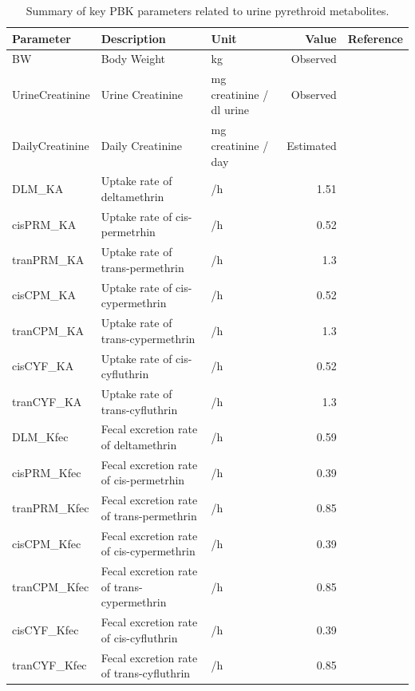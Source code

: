 \documentclass[toxics,article,submit,pdftex,moreauthors]{Definitions/mdpi}
\begin{document}
\begin{table}[H]
\begin{adjustwidth}{-4cm}{}
\caption{Summary of key PBK parameters related to urine pyrethroid metabolites.}
\label{tab:taba3}
\centering
\small
\begin{tabular}{lllrr}
\toprule
Parameter & Description & Unit & Value & Reference\\
\midrule
BW & Body Weight & kg & Observed & \\
UrineCreatinine & Urine Creatinine & mg creatinine / dl urine & Observed & \\
DailyCreatinine & Daily Creatinine & mg creatinine / day & Estimated & \cite{stanfield2022bayesian}\\
DLM\_KA & Uptake rate of deltamethrin & /h & 1.51 & \cite{quindroit2019estimating}\\
cisPRM\_KA & Uptake rate of cis-permetrhin & /h & 0.52 & \cite{quindroit2019estimating}\\
tranPRM\_KA & Uptake rate of trans-permethrin & /h & 1.3 & \cite{quindroit2019estimating}\\
cisCPM\_KA & Uptake rate of cis-cypermethrin & /h & 0.52 & \cite{quindroit2019estimating}\\
tranCPM\_KA & Uptake rate of trans-cypermethrin & /h & 1.3 & \cite{quindroit2019estimating}\\
cisCYF\_KA & Uptake rate of cis-cyfluthrin & /h & 0.52 & \cite{quindroit2019estimating}\\
tranCYF\_KA & Uptake rate of trans-cyfluthrin & /h & 1.3 & \cite{quindroit2019estimating}\\
DLM\_Kfec & Fecal excretion rate of deltamethrin & /h & 0.59 & \cite{quindroit2019estimating}\\
cisPRM\_Kfec & Fecal excretion  rate of cis-permetrhin & /h & 0.39 & \cite{quindroit2019estimating}\\
tranPRM\_Kfec & Fecal excretion  rate of trans-permethrin & /h & 0.85 & \cite{quindroit2019estimating}\\
cisCPM\_Kfec & Fecal excretion rate of cis-cypermethrin & /h & 0.39 & \cite{quindroit2019estimating}\\
tranCPM\_Kfec & Fecal excretion rate of trans-cypermethrin & /h & 0.85 & \cite{quindroit2019estimating}\\
cisCYF\_Kfec & Fecal excretion  rate of cis-cyfluthrin & /h & 0.39 & \cite{quindroit2019estimating}\\
tranCYF\_Kfec & Fecal excretion  rate of trans-cyfluthrin & /h & 0.85 & \cite{quindroit2019estimating}\\

\end{tabular}
\end{adjustwidth}
\end{table}
\end{document}
